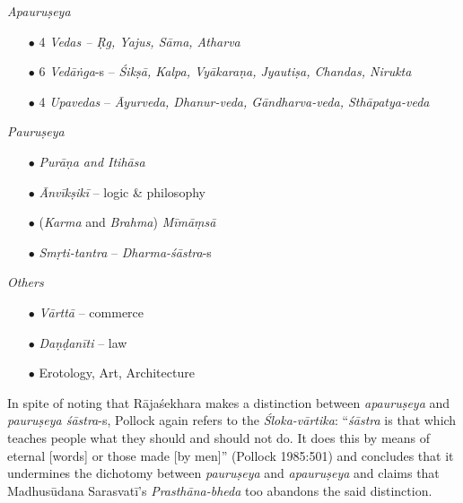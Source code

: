 {\sl Apauruṣeya}
\begin{itemize}
\itemsep=1pt
\item[$\bullet$] 4 {\sl Vedas -- Ṛg, Yajus, Sāma, Atharva}

\item[$\bullet$] 6 {\sl Vedāṅga}-s -- {\sl Śikṣā, Kalpa, Vyākaraṇa, Jyautiṣa, Chandas, Nirukta}

\item[$\bullet$] 4 {\sl Upavedas} -- {\sl Āyurveda, Dhanur-veda, Gāndharva-veda, Sthāpatya-veda}
\end{itemize}
{\sl Pauruṣeya}
\begin{itemize}
\itemsep=1pt
\item[$\bullet$] {\sl Purāṇa and Itihāsa}

\item[$\bullet$] {\sl Ānvīkṣikī} -- logic \& philosophy

\item[$\bullet$] ({\sl Karma} and {\sl Brahma}) {\sl Mīmāṃsā}

\item[$\bullet$] {\sl Smṛti-tantra} -- {\sl Dharma-śāstra}-s
\end{itemize}
{\sl Others}
\begin{itemize}
\itemsep=1pt
\item[$\bullet$] {\sl Vārttā} -- commerce

\item[$\bullet$] {\sl Daṇḍanīti} -- law

\item[$\bullet$] Erotology, Art, Architecture
\end{itemize}

In spite of noting that Rājaśekhara makes a distinction between {\sl apauruṣeya} and {\sl pauruṣeya śāstra}-s, Pollock again refers to the {\sl Śloka-vārtika}: ``{\sl śāstra} is that which teaches people what they should and should not do. It does this by means of eternal [words] or those made [by men]'' (Pollock 1985:501) and concludes that it undermines the dichotomy between {\sl pauruṣeya} and {\sl apauruṣeya} and claims that Madhusūdana Sarasvatī's  {\sl Prasthāna-bheda} too abandons the said distinction. 

